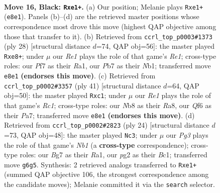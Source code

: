 \documentclass[11pt]{article}
\begin{document}
\clearpage

\begin{figure}[p]\centering
\begin{subfigure}{0.46\textwidth}\centering
\resizebox{\linewidth}{!}{%
\newchessgame
\chessboard[
  setfen={rn2r1k1/pp3pbp/1n3qp1/3p1b2/3P4/1B5P/PPN2PP1/RNBQR1K1 b - - 4 16},
  showmover=false,
  pgfstyle=straightmove, color=movearrow, markmove={e8-e1}
]}
\caption{}
\end{subfigure}\hfill
\begin{subfigure}{0.46\textwidth}\centering
\resizebox{\linewidth}{!}{%
\newchessgame
\chessboard[
  setfen={r2qr1k1/1bp2ppp/5b2/pp1n4/3P4/1BP5/PP1B1PPP/RN1QR1K1 w - - 0 15},
  showmover=false,
  pgfstyle=straightmove, color=movearrow, markmove={e1-e8}
]}
\caption{}
\end{subfigure}
\\[4pt]
\begin{subfigure}{0.46\textwidth}\centering
\resizebox{\linewidth}{!}{%
\newchessgame
\chessboard[
  setfen={r1r3k1/pp2ppbp/4qnp1/3b4/8/P3BNP1/1P1RPPBP/2RQ2K1 b - - 14 21},
  showmover=false,
  pgfstyle=straightmove, color=movearrow, markmove={c8-c1}
]}
\caption{}
\end{subfigure}\hfill
\begin{subfigure}{0.46\textwidth}\centering
\resizebox{\linewidth}{!}{%
\newchessgame
\chessboard[
  setfen={r1bqr1k1/pp3ppp/2pb1n2/2n5/3NP3/6P1/PPQ2PBP/RNBR2K1 w - - 3 13},
  showmover=false,
  pgfstyle=straightmove, color=movearrow, markmove={b1-c3}
]}
\caption{}
\end{subfigure}
\caption{\textbf{Move 16, Black: \texttt{Rxe1+}.} (a) Our position; Melanie plays \texttt{Rxe1+} (\texttt{e8e1}). Panels (b)--(d) are the retrieved master positions whose correspondence most drove this move (highest QAP objective among those that transfer to it). (b) Retrieved from \texttt{ccrl\_top\_p0003\#1373} (ply 28) [structural distance $d$=74, QAP obj=56]: the master played \texttt{Rxe8+}; under $\mu$ our \emph{Re1} plays the role of that game's \emph{Re1}; cross-type roles: our \emph{P}f7 as their \emph{R}a1, our \emph{P}b7 as their \emph{N}b1; transferred move \texttt{e8e1} \textbf{(endorses this move)}. (c) Retrieved from \texttt{ccrl\_top\_p0002\#3357} (ply 41) [structural distance $d$=64, QAP obj=50]: the master played \texttt{Rxc1}; under $\mu$ our \emph{Re1} plays the role of that game's \emph{Rc1}; cross-type roles: our \emph{N}b8 as their \emph{R}a8, our \emph{Q}f6 as their \emph{P}a7; transferred move \texttt{e8e1} \textbf{(endorses this move)}. (d) Retrieved from \texttt{ccrl\_top\_p0002\#2823} (ply 24) [structural distance $d$=73, QAP obj=48]: the master played \texttt{Nc3}; under $\mu$ our \emph{Pg3} plays the role of that game's \emph{Nb1} (a \textbf{cross-type} correspondence); cross-type roles: our \emph{B}g7 as their \emph{R}a1, our \emph{p}g2 as their \emph{B}c1; transferred move \texttt{g6g5}. Synthesis: 2 retrieved analogs transferred to \texttt{Rxe1+} (summed QAP objective 106, the strongest correspondence among the candidate moves); Melanie committed it via the \texttt{search} selector.}
\label{fig:thought-m31}
\end{figure}
\end{document}

